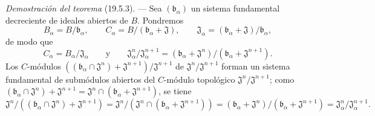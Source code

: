 \begin{env}[19.5.6]
\label{0.19.5.6-fr}
\emph{Demostración del teorema} (19.5.3). --- Sea
$(\mathfrak b_\alpha)$ un sistema fundamental decreciente de ideales abiertos de
$B$. Pondremos
\[
  B_\alpha=B/\mathfrak b_\alpha,\qquad
  C_\alpha=B/(\mathfrak b_\alpha+\mathfrak J),\qquad
  \mathfrak J_\alpha=(\mathfrak b_\alpha+\mathfrak J)/\mathfrak b_\alpha,
\]
de modo que
\[
  C_\alpha=B_\alpha/\mathfrak J_\alpha\qquad\text{y}\qquad
  \mathfrak J_\alpha^n/\mathfrak J_\alpha^{n+1}
  =(\mathfrak b_\alpha+\mathfrak J^n)/(\mathfrak b_\alpha+\mathfrak J^{n+1}).
\]
Los $C$-módulos
$((\mathfrak b_\alpha\cap\mathfrak J^n)+\mathfrak J^{n+1})/
\mathfrak J^{n+1}$ de $\mathfrak J^n/\mathfrak J^{n+1}$ forman un sistema
fundamental de submódulos abiertos del $C$-módulo topológico
$\mathfrak J^n/\mathfrak J^{n+1}$; como
$(\mathfrak b_\alpha\cap\mathfrak J^n)+\mathfrak J^{n+1}
=\mathfrak J^n\cap(\mathfrak b_\alpha+\mathfrak J^{n+1})$, se tiene
\[
  \mathfrak J^n/((\mathfrak b_\alpha\cap\mathfrak J^n)+\mathfrak J^{n+1})
  =\mathfrak J^n/(\mathfrak J^n\cap(\mathfrak b_\alpha+\mathfrak J^{n+1}))
  =(\mathfrak b_\alpha+\mathfrak J^n)/(\mathfrak b_\alpha+\mathfrak J^{n+1})
  =\mathfrak J_\alpha^n/\mathfrak J_\alpha^{n+1}.
\]
\end{env}

